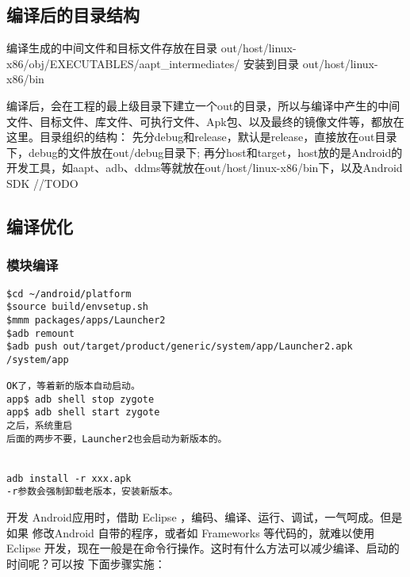 \documentclass[a4paper,titlepage]{article}
\begin{document}
\subsection{编译后的目录结构}
编译生成的中间文件和目标文件存放在目录
out/host/linux-x86/obj/EXECUTABLES/aapt_intermediates/
安装到目录 out/host/linux-x86/bin

编译后，会在工程的最上级目录下建立一个out的目录，所以与编译中产生的中间文件、目标文件、库文件、可执行文件、Apk包、以及最终的镜像文件等，都放在这里。目录组织的结构：
	先分debug和release，默认是release，直接放在out目录下，debug的文件放在out/debug目录下; 	再分host和target，host放的是Android的开发工具，如aapt、adb、ddms等就放在out/host/linux-x86/bin下，以及Android SDK
//TODO



\subsection{编译优化}
\subsubsection{模块编译}
\begin{verbatim}
$cd ~/android/platform
$source build/envsetup.sh
$mmm packages/apps/Launcher2 
$adb remount
$adb push out/target/product/generic/system/app/Launcher2.apk /system/app

OK了，等着新的版本自动启动。 
app$ adb shell stop zygote
app$ adb shell start zygote
之后，系统重启
后面的两步不要，Launcher2也会启动为新版本的。


adb install -r xxx.apk
-r参数会强制卸载老版本，安装新版本。
\end{verbatim}
开发 Android应用时，借助 Eclipse ，编码、编译、运行、调试，一气呵成。但是如果
修改Android 自带的程序，或者如 Frameworks 等代码的，就难以使用 Eclipse
开发，现在一般是在命令行操作。这时有什么方法可以减少编译、启动的时间呢？可以按
下面步骤实施：
\end{document}

